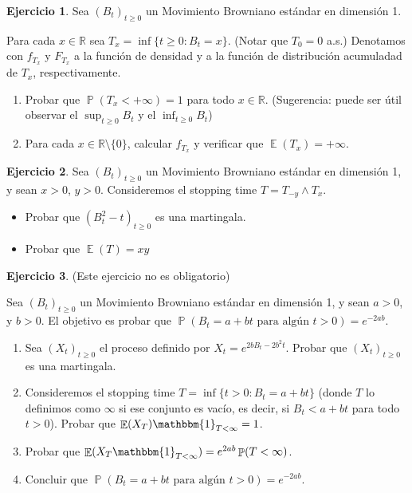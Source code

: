 \documentclass{article}
\DeclareMathOperator{\prob}{\mathbb{P}}
\DeclareMathOperator{\Exp}{\mathbb{E}}
\newcommand{\realnum}{\mathbb{R}}
\newcommand{\characteristic}{\mathbbm{1}}
\theoremstyle{definition}
\newtheorem{exercise}{Ejercicio}
\begin{document}
\begin{exercise}
Sea $(B_t)_{t \geq 0}$ un Movimiento Browniano estándar en dimensión 1.

Para cada $x \in \realnum$ sea $T_x = \inf \{t \geq 0 : B_t = x\}$.
(Notar que \(T_0 = 0\) a.s.)
Denotamos con \(f_{T_x}\) y \(F_{T_x}\) a la función de densidad y a la función de distribución acumuladad de \(T_x\), respectivamente.
\begin{enumerate}[label=\alph*)]
	\item Probar que \(\prob(T_x < + \infty) = 1\) para todo \(x \in \realnum\).
	(Sugerencia: puede ser útil observar el \(\sup_{t \geq 0} B_t\) y el \(\inf_{t \geq 0} B_t\))
	\item Para cada \(x \in \realnum \setminus \{0\}\), calcular \(f_{T_x}\) y verificar que \(\Exp(T_x) = + \infty\).
\end{enumerate}
\end{exercise}

\begin{exercise}
Sea \((B_t)_{t \geq 0}\) un Movimiento Browniano estándar en dimensión 1, y sean \(x > 0\), \(y > 0\).
Consideremos el stopping time \(T = T_{- y} \wedge T_x\).
\begin{itemize}
	\item Probar que \((B_t^2 - t)_{t \geq 0}\) es una martingala.
	\item Probar que \(\Exp(T) = xy\)
\end{itemize}
\end{exercise}

\begin{exercise}
(Este ejercicio no es obligatorio)

Sea \((B_t)_{t \geq 0}\) un Movimiento Browniano estándar en dimensión 1, y sean \(a > 0\), y \(b > 0\).
El objetivo es probar que \(\prob(B_t = a + b t \text{ para algún } t > 0) = e^{- 2 a b}\).
\begin{enumerate}[label=\alph*)]
	\item Sea \((X_t)_{t \geq 0}\) el proceso definido por \(X_t = e^{2 b B_t - 2 b^2 t}\).
	Probar que \((X_t)_{t \geq 0}\) es una martingala.
	\item Consideremos el stopping time \(T = \inf \{t > 0 : B_t = a + b t\}\) (donde \(T\) lo definimos como \(\infty\) si ese conjunto es vacío, es decir, si \(B_t < a + b t\) para todo \(t > 0\)).
	Probar que \(\Exp(X_T) \characteristic_{T < \infty} = 1\).
	\item Probar que \(\Exp(X_T \characteristic_{T < \infty}) = e^{2 a b} \prob(T < \infty)\).
	\item Concluir que \(\prob(B_t = a + b t\text{ para algún } t > 0) = e^{- 2 a b}\).
\end{enumerate}
\end{exercise}
\end{document}
